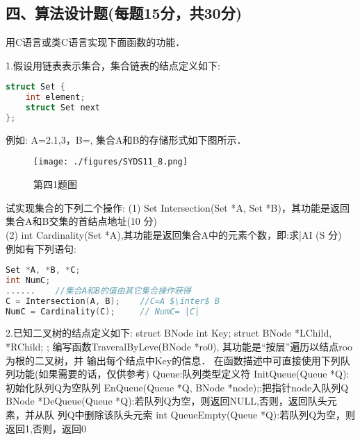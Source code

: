 \subsection{四、算法设计题(每题15分，共30分)}
用C语言或类C语言实现下面函数的功能．

1.假设用链表表示集合，集合链表的结点定义如下:
\begin{lstlisting}[language=cpp]
struct Set {
    int element;
    struct Set next
};
\end{lstlisting}
例如: A={2.1,3}，B={}, 集合A和B的存储形式如下图所示．
\begin{figure}[ht]
\centering
\texttt{[image: ./figures/SYDS11\_8.png]}
\caption{第四1题图} \label{SYDS11_fig8}
\end{figure}
试实现集合的下列二个操作:
(1) Set Intersection(Set *A, Set *B)，其功能是返回集合A和B交集的首结点地址(10 分) \\
(2) int Cardinality(Set *A),其功能是返回集合A中的元素个数，即:求|AI (S 分) \\
例如有下列语句:
\begin{lstlisting}[language=cpp]
Set *A, *B, *C;
int NumC;
......    //集合A和B的值由其它集合操作获得
C = Intersection(A, B);    //C=A $\inter$ B
NumC = Cardinality(C);     // NumC= |C|
\end{lstlisting}

2.已知二叉树的结点定义如下:
struct BNode {
int Key;
struct BNode *LChild, *RChild;
};
编写函数TraveralByLeve(BNode *ro0), 其功能是“按层”遍历以结点roo为根的二叉树，并
输出每个结点中Key的信息．
在函数描述中可直接使用下列队列功能(如果需要的话，仅供参考)
Queue:队列类型定义符
InitQueue(Queue *Q):初始化队列Q为空队列
EnQueue(Queue *Q, BNode *node);:把指针node入队列Q
BNode *DeQueue(Queue *Q):若队列Q为空，则返回NULL,否则，返回队头元素，并从队
列Q中删除该队头元索
int QueueEmpty(Queue *Q):若队列Q为空，则返回1,否则，返回0
